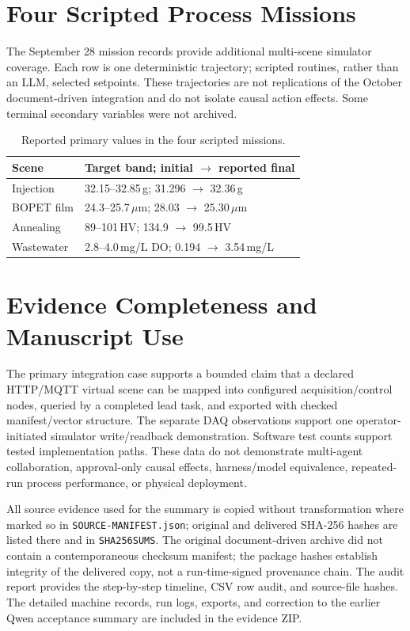 \documentclass[journal]{IEEEtran}
\begin{document}
\section{Four Scripted Process Missions}
The September 28 mission records provide additional multi-scene simulator
coverage. Each row is one deterministic trajectory; scripted routines, rather
than an LLM, selected setpoints. These trajectories are not replications of
the October document-driven integration and do not isolate causal action
effects. Some terminal secondary variables were not archived.

\begin{table}[!t]
\centering
\caption{Reported primary values in the four scripted missions.}
\label{tab:s5-missions}
\footnotesize
\setlength{\tabcolsep}{3pt}
\begin{tabularx}{\columnwidth}{@{}>{\raggedright\arraybackslash}p{1.28cm}X@{}}
\toprule
Scene & Target band; initial $\rightarrow$ reported final \\
\midrule
Injection & 32.15--32.85\,g; 31.296 $\rightarrow$ 32.36\,g \\
BOPET film & 24.3--25.7\,$\mu$m; 28.03 $\rightarrow$ 25.30\,$\mu$m \\
Annealing & 89--101\,HV; 134.9 $\rightarrow$ 99.5\,HV \\
Wastewater & 2.8--4.0\,mg/L DO; 0.194 $\rightarrow$ 3.54\,mg/L \\
\bottomrule
\end{tabularx}
\end{table}

\section{Evidence Completeness and Manuscript Use}
The primary integration case supports a bounded claim that a declared
HTTP/MQTT virtual scene can be mapped into configured acquisition/control
nodes, queried by a completed lead task, and exported with checked
manifest/vector structure. The separate DAQ observations support one
operator-initiated simulator write/readback demonstration. Software test
counts support tested implementation paths. These data do not demonstrate
multi-agent collaboration, approval-only causal effects, harness/model
equivalence, repeated-run process performance, or physical deployment.

All source evidence used for the summary is copied without transformation
where marked so in \texttt{SOURCE-MANIFEST.json}; original and delivered
SHA-256 hashes are listed there and in \texttt{SHA256SUMS}. The original
document-driven archive did not contain a contemporaneous checksum manifest;
the package hashes establish integrity of the delivered copy, not a
run-time-signed provenance chain. The audit report provides the step-by-step
timeline, CSV row audit, and source-file hashes. The detailed machine
records, run logs, exports, and correction to the earlier Qwen acceptance
summary are included in the evidence ZIP.
\end{document}
